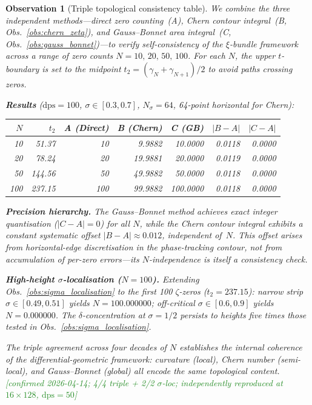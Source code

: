 \documentclass[11pt, a4paper]{article}
\theoremstyle{definition}
\theoremstyle{plain}
\newtheorem{observation}[theorem]{Observation}
\newcommand{\xif}{\xi}                      %
\begin{document}
\begin{observation}[Triple topological consistency table]
\label{obs:triple_consistency}
We combine the three independent methods---direct zero counting~(A),
Chern contour integral~(B, Obs.~\ref{obs:chern_zeta}), and
Gauss--Bonnet area integral~(C, Obs.~\ref{obs:gauss_bonnet})---to
verify self-consistency of the $\xif$-bundle framework across a range
of zero counts $N=10,\,20,\,50,\,100$.
For each $N$, the upper $t$-boundary is set to the midpoint
$t_2 = (\gamma_N+\gamma_{N+1})/2$ to avoid paths crossing zeros.

\smallskip\noindent
\textbf{Results} ($\mathrm{dps}=100$, $\sigma\in[0.3,0.7]$,
$N_\sigma=64$, 64-point horizontal for Chern):

\begin{center}
\begin{tabular}{rr rrr rr}
\toprule
$N$ & $t_2$ & A (Direct) & B (Chern) & C (GB)
    & $|B{-}A|$ & $|C{-}A|$ \\
\midrule
10  & 51.37 & 10  & 9.9882  & 10.0000 & 0.0118 & 0.0000 \\
20  & 78.24 & 20  & 19.9881 & 20.0000 & 0.0119 & 0.0000 \\
50  & 144.56 & 50 & 49.9882 & 50.0000 & 0.0118 & 0.0000 \\
100 & 237.15 & 100 & 99.9882 & 100.0000 & 0.0118 & 0.0000 \\
\bottomrule
\end{tabular}
\end{center}

\noindent
\textbf{Precision hierarchy.}\;
The Gauss--Bonnet method achieves exact integer quantisation
($|C{-}A|=0$) for all $N$, while the Chern contour integral
exhibits a constant systematic offset $|B{-}A|\approx 0.012$,
independent of~$N$.
This offset arises from horizontal-edge discretisation in the
phase-tracking contour, \emph{not} from accumulation of
per-zero errors---its $N$-independence is itself a consistency
check.

\smallskip\noindent
\textbf{High-height $\sigma$-localisation ($N\!=\!100$).}\;
Extending Obs.~\ref{obs:sigma_localisation} to the first 100
$\zeta$-zeros ($t_2=237.15$):
narrow strip $\sigma\in[0.49,0.51]$ yields $N=100.000000$;
off-critical $\sigma\in[0.6,0.9]$ yields $N=0.000000$.
The $\delta$-concentration at $\sigma=1/2$ persists to heights
five times those tested in Obs.~\ref{obs:sigma_localisation}.

\smallskip\noindent
The triple agreement across four decades of $N$ establishes
the internal coherence of the differential-geometric framework:
curvature (local), Chern number (semi-local), and Gauss--Bonnet
(global) all encode the same topological content.
\textcolor{ForestGreen}{[confirmed 2026-04-14; 4/4 triple + 2/2 $\sigma$-loc;
independently reproduced at $16\!\times\!128$, $\mathrm{dps}=50$]}
\end{observation}
\end{document}
